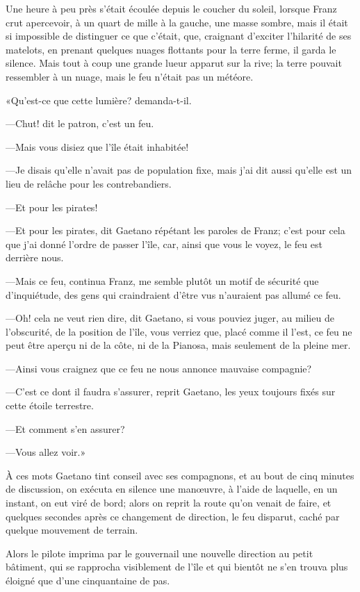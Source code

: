 Une heure à peu près s'était écoulée depuis le coucher du soleil, lorsque Franz crut apercevoir, à un quart de mille à la gauche, une masse sombre, mais il était si impossible de distinguer ce que c'était, que, craignant d'exciter l'hilarité de ses matelots, en prenant quelques nuages flottants pour la terre ferme, il garda le silence. Mais tout à coup une grande lueur apparut sur la rive; la terre pouvait ressembler à un nuage, mais le feu n'était pas un météore.

«Qu'est-ce que cette lumière? demanda-t-il.

—Chut! dit le patron, c'est un feu.

—Mais vous disiez que l'île était inhabitée!

—Je disais qu'elle n'avait pas de population fixe, mais j'ai dit aussi qu'elle est un lieu de relâche pour les contrebandiers.

—Et pour les pirates!

—Et pour les pirates, dit Gaetano répétant les paroles de Franz; c'est pour cela que j'ai donné l'ordre de passer l'île, car, ainsi que vous le voyez, le feu est derrière nous.

—Mais ce feu, continua Franz, me semble plutôt un motif de sécurité que d'inquiétude, des gens qui craindraient d'être vus n'auraient pas allumé ce feu.

—Oh! cela ne veut rien dire, dit Gaetano, si vous pouviez juger, au milieu de l'obscurité, de la position de l'île, vous verriez que, placé comme il l'est, ce feu ne peut être aperçu ni de la côte, ni de la Pianosa, mais seulement de la pleine mer.

—Ainsi vous craignez que ce feu ne nous annonce mauvaise compagnie?

—C'est ce dont il faudra s'assurer, reprit Gaetano, les yeux toujours fixés sur cette étoile terrestre.

—Et comment s'en assurer?

—Vous allez voir.»

À ces mots Gaetano tint conseil avec ses compagnons, et au bout de cinq minutes de discussion, on exécuta en silence une manœuvre, à l'aide de laquelle, en un instant, on eut viré de bord; alors on reprit la route qu'on venait de faire, et quelques secondes après ce changement de direction, le feu disparut, caché par quelque mouvement de terrain.

Alors le pilote imprima par le gouvernail une nouvelle direction au petit bâtiment, qui se rapprocha visiblement de l'île et qui bientôt ne s'en trouva plus éloigné que d'une cinquantaine de pas.

